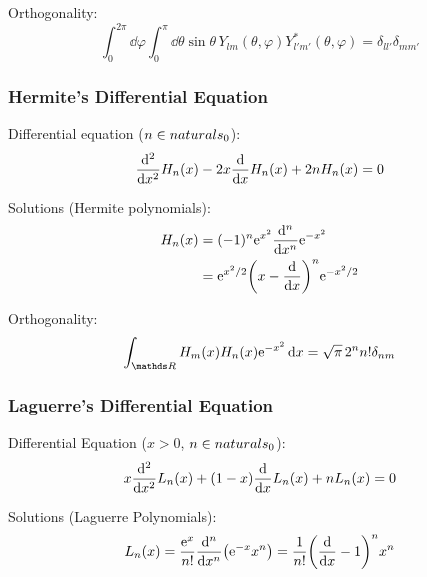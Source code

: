 			\noindent
			Orthogonality:
			\begin{equation}
				\int_0^{2\pi}\dd\varphi \int_0^{\pi}\dd\theta \sin\theta\, Y_{lm}(\theta,\varphi) Y^{*}_{l'm'}(\theta,\varphi) = 	\delta_{ll'}\delta_{mm'}
			\end{equation}

		\subsubsection{Hermite's Differential Equation}
			\noindent
			Differential equation ($n\in\\naturals _0$):
			\begin{equation}
				\dv[2]{x} H_n(x) -2x\dv{x} H_n(x) +2 n H_n(x)=0
			\end{equation}

			\noindent
			Solutions (Hermite polynomials):
			\begin{equation} \label{Eq:HermitePolynomials}
				\begin{aligned}
					H_n(x) &= (-1)^n \mathrm{e}^{x^2} \dv[n]{x} \mathrm{e}^{-x^2} \\
					&= \mathrm{e}^{x^2/2}\qty(x-\dv{x})^n \mathrm{e}^{-x^2/2} \\
				\end{aligned}
			\end{equation}

			\noindent
			Orthogonality:
			\begin{equation}
				\int_{\reals } H_m(x) H_n(x) \ex^{-x^2}\dd{x} = \sqrt{\pi}\,2^n n!\delta_{nm}
			\end{equation}

		\subsubsection{Laguerre's Differential Equation}
			\noindent
			Differential Equation ($x>0$, $n\in\\naturals _0$):
			\begin{equation}
				x\dv[2]{x}L_n(x) +(1-x)\dv{x}L_n(x) + nL_n(x) = 0
			\end{equation}

			\noindent
			Solutions (Laguerre Polynomials):
			\begin{equation}
				L_n(x) = \frac{\mathrm{e}^x}{n!}\dv[n]{x}(\mathrm{e}^{-x} x^n) = \frac{1}{n!} \qty(\dv{x}-1)^n x^n
			\end{equation}


